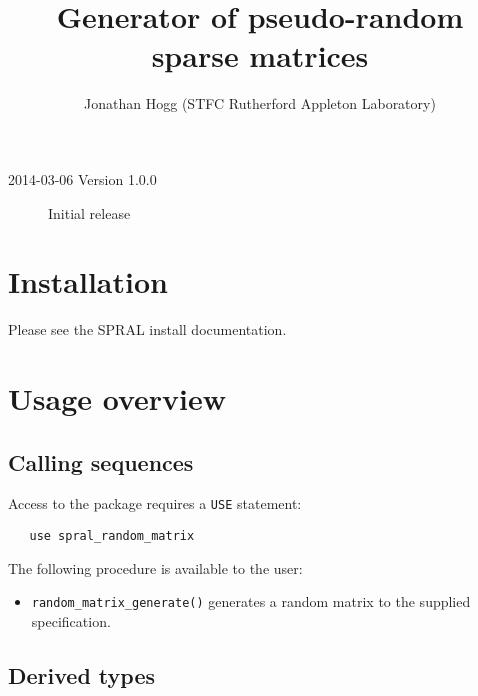 
\title{Generator of pseudo-random sparse matrices}
\author{Jonathan Hogg (STFC Rutherford Appleton Laboratory)}
\spralmaketitle
\thispagestyle{firststyle}

\versionhistory
\begin{description}
\item[2014-03-06 Version 1.0.0] Initial release
\end{description}


\section{Installation}
Please see the SPRAL install documentation.


\section{Usage overview}

\subsection{Calling sequences}

Access to the package requires a {\tt USE} statement:
\begin{verbatim}
   use spral_random_matrix
\end{verbatim}

\noindent
The following procedure is available to the user:
\begin{itemize}
   \item {\tt random\_matrix\_generate()} generates a random matrix to the
      supplied specification.
\end{itemize}


\subsection{Derived types} \label{derived types}

